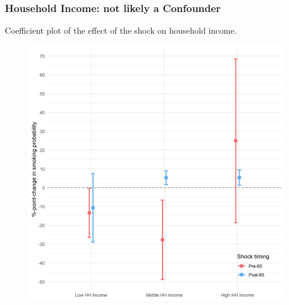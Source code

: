 \documentclass[10pt,compress,xcolor=dvipsnames]{beamer}    %
\newcounter{ex}
\newcommand{\1}[1]{\mathrm{1\hspace*{-2.5pt}l}[#1]}	%
\begin{document}
\begin{frame}
\frametitle{Household Income: not likely a Confounder}
Coefficient plot of the effect of the shock on household income.
\begin{figure}[hbtp]
\centering
\includegraphics[height=0.8\textheight]{../../3_output/shock_effects/hhinc_6070_100_cvplot.png}
\label{fig:hhinc}
\end{figure}
\end{frame}

\end{document}

